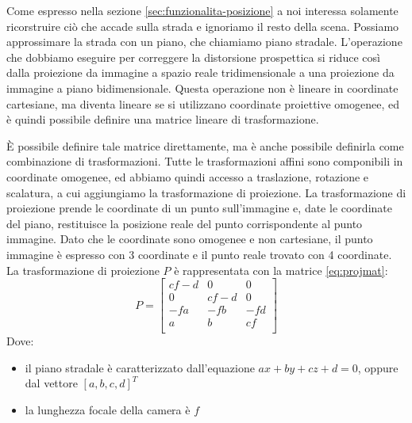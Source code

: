 Come espresso nella sezione \ref{sec:funzionalita-posizione} a noi interessa solamente ricorstruire ciò che accade sulla strada e ignoriamo il resto della scena.
Possiamo approssimare la strada con un piano, che chiamiamo piano stradale.
L'operazione che dobbiamo eseguire per correggere la distorsione prospettica si riduce così dalla proiezione da immagine a spazio reale tridimensionale a una proiezione da immagine a piano bidimensionale.
Questa operazione non è lineare in coordinate cartesiane, ma diventa lineare se si utilizzano coordinate proiettive omogenee, ed è quindi possibile definire una matrice lineare di trasformazione.

È possibile definire tale matrice direttamente, ma è anche possibile definirla come combinazione di trasformazioni.
Tutte le trasformazioni affini sono componibili in coordinate omogenee, ed abbiamo quindi accesso a traslazione, rotazione e scalatura, a cui aggiungiamo la trasformazione di proiezione.
La trasformazione di proiezione prende le coordinate di un punto sull'immagine e, date le coordinate del piano, restituisce la posizione reale del punto corrispondente al punto immagine.
Dato che le coordinate sono omogenee e non cartesiane, il punto immagine è espresso con 3 coordinate e il punto reale trovato con 4 coordinate.
La trasformazione di proiezione $P$ è rappresentata con la matrice \ref{eq:projmat}:
\begin{equation}
        \label{eq:projmat}
        P = 
        \begin{bmatrix}
            cf - d & 0      & 0   \\
            0      & cf - d & 0   \\
            -fa    & -fb    & -fd \\
            a      & b      & cf  \\
        \end{bmatrix}
\end{equation}
Dove:
\begin{itemize}
    \item il piano stradale è caratterizzato dall'equazione $ax + by + cz + d = 0$, oppure dal vettore $[a, b, c, d]^T$
    \item la lunghezza focale della camera è $f$
\end{itemize}

